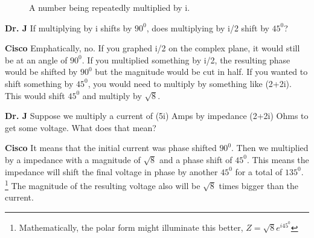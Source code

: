 \begin{figure}[H]
\begin{center}
\end{center}
\caption{A number being repeatedly multiplied by i.}
\label{F:8COM}
\end{figure}

\setlength{\hangindent}{30pt}\noindent \textbf{Dr. J}
If multiplying by i shifts by $90^0$, does multiplying by i/2 shift by $45^0$?

\setlength{\hangindent}{30pt}\noindent \textbf{Cisco}
Emphatically, no. If you graphed i/2 on the complex plane, it would still be at an angle of $90^0$. If you multiplied something by i/2, the resulting phase would be shifted by $90^0$ but the magnitude would be cut in half. If you wanted to shift something by $45^0$, you would need to multiply by something like (2+2i). This would shift $45^0$ and multiply by $\sqrt{8}$.

\setlength{\hangindent}{30pt}\noindent \textbf{Dr. J}
Suppose we multiply a current of (5i) Amps by impedance (2+2i) Ohms to get some voltage. What does that mean?

\setlength{\hangindent}{30pt}\noindent \textbf{Cisco}
It means that the initial current was phase shifted $90^0$. Then we multiplied by a impedance with a magnitude of $\sqrt{8}$ and a phase shift of $45^0$. This means the impedance will shift the final voltage in phase by another $45^0$ for a total of $135^0$. \footnote{Mathematically, the polar form might illuminate this better, $Z =\sqrt{8}e^{i45^0}$ } The magnitude of the resulting voltage also will be $\sqrt{8}$ times bigger than the current.

